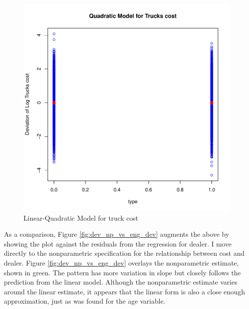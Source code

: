 \documentclass[11pt]{paper}
\begin{document}
\begin{figure}[h!]
  \centering
  \includegraphics[scale = 0.5, keepaspectratio=true]{../Figures/dev_vs_eng}
  \caption{Linear-Quadratic Model for truck cost} \label{fig:dev_vs_eng}
\end{figure}



\pagebreak
As a comparison, Figure \ref{fig:dev_np_vs_eng_dev} 
augments the above by showing the plot against the 
residuals from the regression for dealer.
% 
I move directly to the nonparametric specification for 
the relationship between cost and dealer.
Figure \ref{fig:dev_np_vs_eng_dev} 
overlays the nonparametric estimate, shown in green. 
The pattern has more variation in slope but 
closely follows the prediction from the linear model. 
Although the nonparametric estimate varies around the linear estimate,
it appears that the linear form
is also a close enough approximation, 
just as was found for the age variable.
\end{document}
